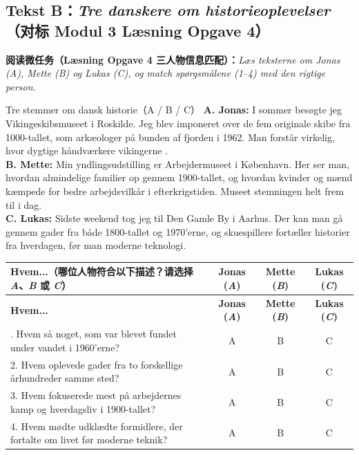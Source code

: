 \subsection*{Tekst B：\textit{Tre danskere om historieoplevelser}（对标 Modul 3 Læsning Opgave 4）}

\textbf{阅读微任务（Læsning Opgave 4 三人物信息匹配）：}\textit{Læs teksterne om Jonas (A), Mette (B) og Lukas (C), og match spørgsmålene (1--4) med den rigtige person.}

\begin{emailbox}{Tre stemmer om dansk historie（A / B / C）}
\textbf{A. Jonas:} I sommer besøgte jeg Vikingeskibsmuseet i Roskilde. Jeg blev imponeret over de fem originale skibe fra 1000-tallet, som arkæologer  på bunden af fjorden i 1962. Man forstår virkelig, hvor dygtige håndværkere vikingerne .\\
\textbf{B. Mette:} Min yndlingsudstilling er Arbejdermuseet i København. Her ser man, hvordan almindelige familier  op gennem 1900-tallet, og hvordan kvinder og mænd kæmpede for bedre arbejdsvilkår i efterkrigstiden. Museet  stemningen helt frem til i dag.\\
\textbf{C. Lukas:} Sidste weekend tog jeg til Den Gamle By i Aarhus. Der kan man gå gennem gader fra både 1800-tallet og 1970'erne, og skuespillere fortæller historier fra hverdagen, før man  moderne teknologi.
\end{emailbox}

{\small
\renewcommand{\arraystretch}{1.24}
\begin{xltabular}{\linewidth}{@{} X c c c @{}}
\toprule
\textbf{Hvem...（哪位人物符合以下描述？请选择 \textit{A}、\textit{B} 或 \textit{C}）} & \textbf{Jonas (\textit{A})} & \textbf{Mette (\textit{B})} & \textbf{Lukas (\textit{C})} \\
\midrule
\endfirsthead
\toprule
\textbf{Hvem...} & \textbf{Jonas (\textit{A})} & \textbf{Mette (\textit{B})} & \textbf{Lukas (\textit{C})} \\
\midrule
\endhead
\bottomrule
{}. Hvem så noget, som var blevet fundet under vandet i 1960'erne? & A & B & C \\
2. Hvem oplevede gader fra to forskellige århundreder samme sted? & A & B & C \\
3. Hvem fokuserede mest på arbejdernes kamp og hverdagsliv i 1900-tallet? & A & B & C \\
4. Hvem mødte udklædte formidlere, der fortalte om livet før moderne teknik? & A & B & C \\
\bottomrule
\end{xltabular}
}

